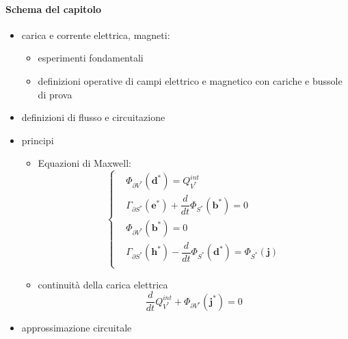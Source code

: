 \vspace{20pt}
\paragraph{Schema del capitolo}
\begin{itemize}
  \item carica e corrente elettrica, magneti:
  \begin{itemize}
    \item esperimenti fondamentali
    \item definizioni operative di campi elettrico e magnetico con cariche e bussole di prova
  \end{itemize}
  \item definizioni di flusso e circuitazione
  \item principi
    \begin{itemize}
        \item Equazioni di Maxwell:
            \begin{equation}
                \begin{cases}
                    &  \Phi_{\partial V^*}(\mathbf{d}^*) = Q_{V^*}^{int} \\
                    &  \Gamma_{\partial S^*}(\mathbf{e}^*) + \dfrac{d}{dt}\Phi_{S^*}(\mathbf{b}^*) = 0 \\
                    &  \Phi_{\partial V^*}(\mathbf{b}^*) = 0 \\
                    &  \Gamma_{\partial S^*}(\mathbf{h}^*) - \dfrac{d}{dt}\Phi_{S^*}(\mathbf{d}^*) = \Phi_{S^*}(\mathbf{j}) \\
                \end{cases}
            \end{equation}
        \item continuità della carica elettrica
            \begin{equation}
                \dfrac{d}{dt} Q_{V^*}^{int} + \Phi_{\partial V^*}(\mathbf{j}^*) = 0
            \end{equation}
    \end{itemize}
  \item approssimazione circuitale
\end{itemize}


% 


